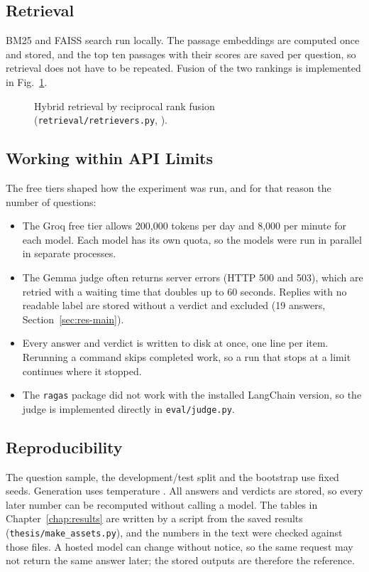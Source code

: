 \subsection{Retrieval}
BM25 and FAISS search run locally. The passage embeddings are computed once and stored, and the top ten
passages with their scores are saved per question, so retrieval does not have to be repeated. Fusion
of the two rankings is implemented in Fig.~\ref{fig:lst-hybrid}.

\begin{figure}[htbp]

\caption{Hybrid retrieval by reciprocal rank fusion (\texttt{retrieval/retrievers.py},
).}\label{fig:lst-hybrid}
\end{figure}

\subsection{Working within API Limits}\label{sec:api-limits}
The free tiers shaped how the experiment was run, and for that reason the number of questions:
\begin{itemize}
\item The Groq free tier allows 200,000 tokens per day and 8,000 per minute for each model. Each
  model has its own quota, so the models were run in parallel in separate processes.
\item The Gemma judge often returns server errors (HTTP 500 and 503), which are retried with a waiting
  time that doubles up to 60 seconds. Replies with no readable label are stored without a verdict and
  excluded (19 answers, Section~\ref{sec:res-main}).
\item Every answer and verdict is written to disk at once, one line per item. Rerunning a command skips
  completed work, so a run that stops at a limit continues where it stopped.
\item The \texttt{ragas} package did not work with the installed LangChain version, so the judge is
  implemented directly in \texttt{eval/judge.py}.
\end{itemize}

\subsection{Reproducibility}
The question sample, the development/test split and the bootstrap use fixed seeds. Generation uses
temperature . All answers and verdicts are stored, so every later number can be
recomputed without calling a model. The tables in Chapter~\ref{chap:results} are written by a script from
the saved results (\texttt{thesis/make\_assets.py}), and the numbers in the text were checked against those
files. A hosted
model can change without notice, so the same request may not return the same answer later; the stored
outputs are therefore the reference.
